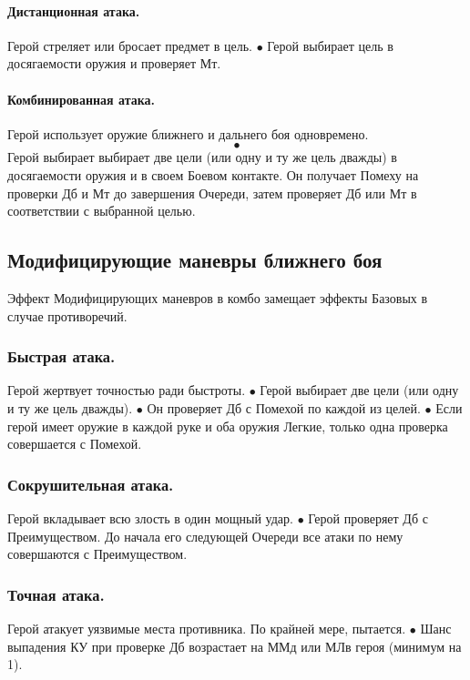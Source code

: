 \paragraph{Дистанционная атака.} Герой стреляет или бросает предмет в цель. 
$\bullet$ Герой выбирает цель в досягаемости оружия и проверяет Мт. 

\paragraph{Комбинированная атака.} Герой использует оружие ближнего и дальнего боя одновремено. 
$$\bullet$$ Герой выбирает выбирает две цели (или одну и ту же цель дважды) в досягаемости оружия и в своем Боевом контакте. Он получает Помеху на проверки Дб и Мт до завершения Очереди, затем проверяет Дб или Мт в соответствии с выбранной целью. 

\subsection{Модифицирующие маневры ближнего боя}
Эффект Модифицирующих маневров в комбо замещает эффекты Базовых в случае противоречий. 

\subsubsection{Быстрая атака.}
Герой жертвует точностью ради быстроты.
$\bullet$ Герой выбирает две цели (или одну и ту же цель дважды). 
\newline $\bullet$ Он проверяет Дб с Помехой по каждой из целей. 
\newline $\bullet$ Если герой имеет оружие в каждой руке и оба оружия Легкие, только одна проверка совершается с Помехой. 

\subsubsection{Сокрушительная атака.}
Герой вкладывает всю злость в один мощный удар.
$\bullet$ Герой проверяет Дб с Преимуществом. До начала его следующей Очереди все атаки по нему совершаются с Преимуществом. 

\subsubsection{Точная атака.}
Герой атакует уязвимые места противника. По крайней мере, пытается. 
$\bullet$ Шанс выпадения КУ при проверке Дб возрастает на ММд или МЛв героя (минимум на 1).

